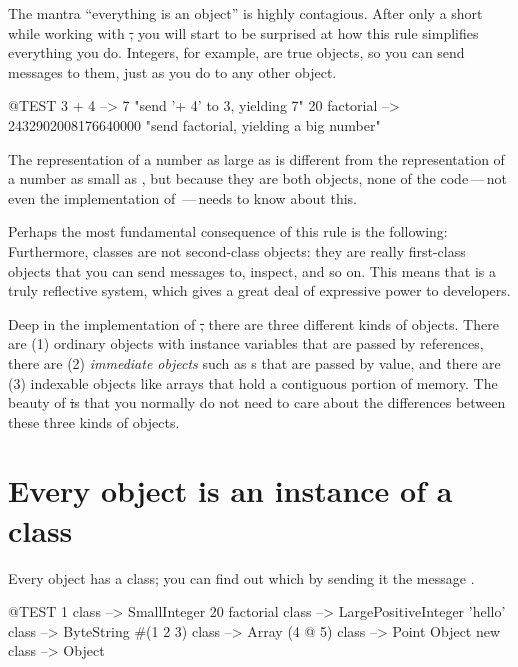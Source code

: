 \documentclass[a4paper,10pt,twoside]{book}
\begin{document}

The mantra ``everything is an object'' is highly contagious.
After only a short while working with \st, you will start to be surprised at how this rule simplifies everything you do.
Integers, for example, are true objects, so you can send messages to them, just as you do to any other object.

\begin{code}{@TEST}
3 + 4            --> 7    "send '+ 4' to 3, yielding 7"
20 factorial  --> 2432902008176640000   "send factorial, yielding a big number"
\end{code}

The representation of a number as large as  is different from the representation of a number as small as , but because they are both objects, none of the code\,---\,not even the implementation of \,---\,needs to know about this.

Perhaps the most fundamental consequence of this rule is the following:
Furthermore, classes are not second-class objects: they are really first-class objects that you can send messages to, inspect, and so on.
This means that \squeak is a truly reflective system, which gives a great deal of expressive power to developers.

Deep in the implementation of \st, there are three different kinds of objects.
There are (1) ordinary objects with instance variables that are passed by references, there are (2) \emph{immediate objects} such as s that are passed by value, and there are (3) indexable objects like arrays that hold a contiguous portion of memory.
The beauty of \st is that you normally do not need to care about the differences between these three kinds of objects.

\section{Every object is an instance of a class}


Every object has a class; you can find out which by sending it the message .

\begin{code}{@TEST}
1 class                --> SmallInteger
20 factorial class --> LargePositiveInteger
'hello' class          --> ByteString
#(1 2 3) class      --> Array
(4 @ 5) class         --> Point
Object new class --> Object
\end{code}
\end{document}
